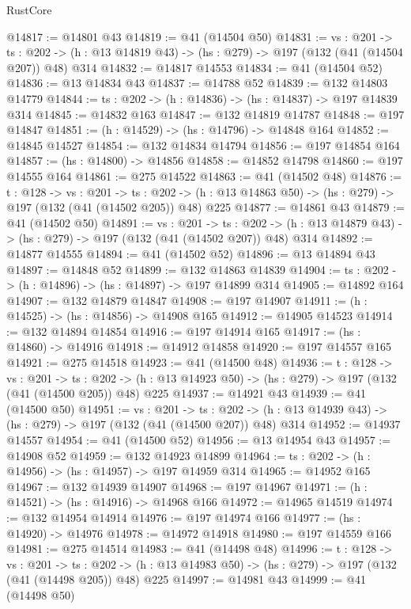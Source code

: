 \begin{lexlean}{RustCore}
\begin{coremodule}
@14817 := @14801 @43
@14819 := @41 (@14504 @50)
@14831 := {vs : @201} ->
  {ts : @202} -> (h : @13 @14819 @43) -> (hs : @279) -> @197 (@132 (@41 (@14504 @207)) @48) @314
@14832 := @14817 @14553
@14834 := @41 (@14504 @52)
@14836 := @13 @14834 @43
@14837 := @14788 @52
@14839 := @132 @14803 @14779
@14844 := {ts : @202} -> (h : @14836) -> (hs : @14837) -> @197 @14839 @314
@14845 := @14832 @163
@14847 := @132 @14819 @14787
@14848 := @197 @14847
@14851 := (h : @14529) -> (hs : @14796) -> @14848 @164
@14852 := @14845 @14527
@14854 := @132 @14834 @14794
@14856 := @197 @14854 @164
@14857 := (hs : @14800) -> @14856
@14858 := @14852 @14798
@14860 := @197 @14555 @164
@14861 := @275 @14522
@14863 := @41 (@14502 @48)
@14876 := {t : @128} ->
  {vs : @201} ->
  {ts : @202} -> (h : @13 @14863 @50) -> (hs : @279) -> @197 (@132 (@41 (@14502 @205)) @48) @225
@14877 := @14861 @43
@14879 := @41 (@14502 @50)
@14891 := {vs : @201} ->
  {ts : @202} -> (h : @13 @14879 @43) -> (hs : @279) -> @197 (@132 (@41 (@14502 @207)) @48) @314
@14892 := @14877 @14555
@14894 := @41 (@14502 @52)
@14896 := @13 @14894 @43
@14897 := @14848 @52
@14899 := @132 @14863 @14839
@14904 := {ts : @202} -> (h : @14896) -> (hs : @14897) -> @197 @14899 @314
@14905 := @14892 @164
@14907 := @132 @14879 @14847
@14908 := @197 @14907
@14911 := (h : @14525) -> (hs : @14856) -> @14908 @165
@14912 := @14905 @14523
@14914 := @132 @14894 @14854
@14916 := @197 @14914 @165
@14917 := (hs : @14860) -> @14916
@14918 := @14912 @14858
@14920 := @197 @14557 @165
@14921 := @275 @14518
@14923 := @41 (@14500 @48)
@14936 := {t : @128} ->
  {vs : @201} ->
  {ts : @202} -> (h : @13 @14923 @50) -> (hs : @279) -> @197 (@132 (@41 (@14500 @205)) @48) @225
@14937 := @14921 @43
@14939 := @41 (@14500 @50)
@14951 := {vs : @201} ->
  {ts : @202} -> (h : @13 @14939 @43) -> (hs : @279) -> @197 (@132 (@41 (@14500 @207)) @48) @314
@14952 := @14937 @14557
@14954 := @41 (@14500 @52)
@14956 := @13 @14954 @43
@14957 := @14908 @52
@14959 := @132 @14923 @14899
@14964 := {ts : @202} -> (h : @14956) -> (hs : @14957) -> @197 @14959 @314
@14965 := @14952 @165
@14967 := @132 @14939 @14907
@14968 := @197 @14967
@14971 := (h : @14521) -> (hs : @14916) -> @14968 @166
@14972 := @14965 @14519
@14974 := @132 @14954 @14914
@14976 := @197 @14974 @166
@14977 := (hs : @14920) -> @14976
@14978 := @14972 @14918
@14980 := @197 @14559 @166
@14981 := @275 @14514
@14983 := @41 (@14498 @48)
@14996 := {t : @128} ->
  {vs : @201} ->
  {ts : @202} -> (h : @13 @14983 @50) -> (hs : @279) -> @197 (@132 (@41 (@14498 @205)) @48) @225
@14997 := @14981 @43
@14999 := @41 (@14498 @50)

\end{coremodule}
\end{lexlean}
